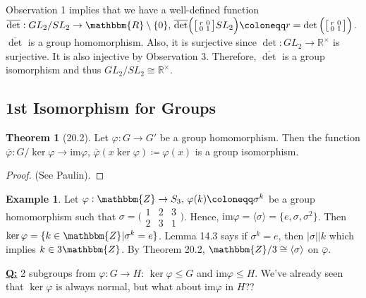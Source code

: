 \documentclass{article}
\newcommand{\Z}{\mathbbm{Z}}
\newcommand{\R}{\mathbbm{R}}
\newcommand{\coleq}{\coloneqq}
\newcommand{\define}[1]{\textbf{\underline{#1}}}
\newcommand{\func}[3]{#1: #2 \to #3}
\theoremstyle{definition}
\newtheorem*{thm}{Theorem}
\newtheorem*{ex}{Example}
\theoremstyle{remark}
\newcommand{\Rx}{\mathbb{R}^\times}
\newcommand{\cyc}[1]{\langle#1\rangle}
\newcommand{\im}{\mathrm{im}}
\newcommand{\iso}{\cong}
\begin{document}
{{            \noindent Observation 1 implies that we have a well-defined function $\func{\overline{\det}}{GL_2/SL_2}{\R\setminus\{0\}}, \, \overline{\det}\Big(\big[\begin{smallmatrix} r & 0\\ 0 & 1 \end{smallmatrix}\big]SL_2\Big)\coleq r=\det\Big(\big[\begin{smallmatrix} r & 0\\ 0 & 1 \end{smallmatrix}\big]\Big)$. ${\overline{\det}}$ is a group homomorphism. Also, it is surjective since $\func{\det}{GL_2}{\Rx}$ is surjective. It is also injective by Observation 3. Therefore, $\overline{\det}$ is a group isomorphism and thus $GL_2/SL_2 \iso \Rx$.
        }
        \subsection*{1st Isomorphism for Groups}{
            \begin{thm}[20.2]
                Let $\func{\varphi}{G}{G'}$ be a group homomorphism. Then the function $\func{\overline{\varphi}}{G/\ker\varphi}{\im\varphi}, \, \overline{\varphi}(x\ker\varphi)\coleq \varphi(x)$ is a group isomorphism.
            \end{thm}
            
            \begin{proof}
                (See Paulin).
            \end{proof}
            
            \begin{ex}
                Let $\func{\varphi}{\Z}{S_3}, \, \varphi(k)\coleq \sigma^k$ be a group homomorphism such that $\sigma=\big(\begin{smallmatrix} 1 & 2 & 3\\ 2 & 3 & 1 \end{smallmatrix}\big)$. Hence, $\im \varphi=\cyc{\sigma}=\{e,\sigma,\sigma^2\}$. Then $\ker\varphi=\{k \in \Z|\sigma^k=e\}$. Lemma 14.3 says if $\sigma^k=e$, then $|\sigma|\big|k$ which implies $k\in 3\Z$. By Theorem 20.2, $\Z/3 \iso \cyc{\sigma}$ on $\overline{\varphi}$. 
            \end{ex}
        }
        
        \noindent\define{Q:} 2 subgroups from $\varphi: G \to H$: $\ker\varphi\leq G$ and $\im\varphi\leq H$. We've already seen that $\ker\varphi$ is always normal, but what about $\im \varphi$ in $H$??
    }
    
\end{document}
